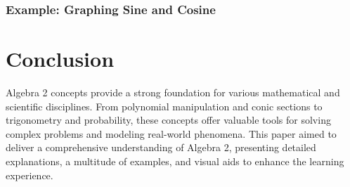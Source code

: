 \documentclass{article}
\begin{document}
\subsubsection{Example: Graphing Sine and Cosine}
\begin{center}
\end{center}

\section{Conclusion}
Algebra 2 concepts provide a strong foundation for various mathematical and scientific disciplines. From polynomial manipulation and conic sections to trigonometry and probability, these concepts offer valuable tools for solving complex problems and modeling real-world phenomena. This paper aimed to deliver a comprehensive understanding of Algebra 2, presenting detailed explanations, a multitude of examples, and visual aids to enhance the learning experience.
\end{document}
